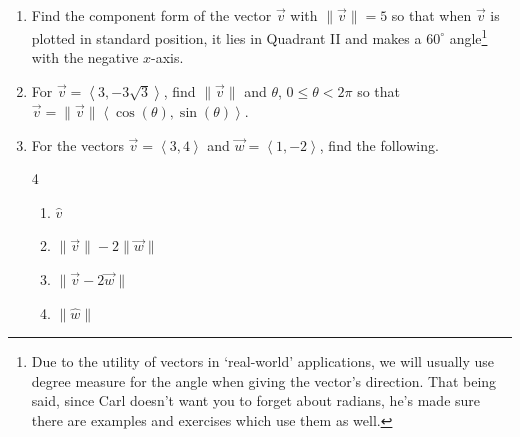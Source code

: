 \documentclass{ximera}
\begin{document}
\newpage

\begin{example} \label{polarformvecex} $~$

\begin{enumerate}

\item \label{resolvecomponents} Find the component form of the vector $\overrightarrow{v}$ with $\|\overrightarrow{v}\| = 5$ so that when $\overrightarrow{v}$ is plotted in standard position, it lies in Quadrant II and makes a $60^{\circ}$ angle\footnote{Due to the utility of vectors in `real-world' applications, we will usually use degree measure for the angle when giving the vector's direction.  That being said, since Carl doesn't want you to forget about radians, he's made sure there are examples and exercises which use them as well.} with the negative $x$-axis.

\item  For $\overrightarrow{v} = \left<3, -3\sqrt{3}\right>$, find $\|\overrightarrow{v}\|$ and $\theta$, $0 \leq \theta < 2\pi$ so that $\overrightarrow{v} = \| \overrightarrow{v} \| \left<\cos(\theta), \sin(\theta)\right>$.

\item For the vectors $\overrightarrow{v} = \left<3,4\right>$ and $\overrightarrow{w} = \left<1, -2\right>$, find the following.

\begin{multicols}{4}

\begin{enumerate}

\item  $\hat{v}$

\item  $\| \overrightarrow{v} \| -2 \|\overrightarrow{w}\|$

\item  $\| \overrightarrow{v} -2\overrightarrow{w}\|$

\item  $\| \hat{w} \|$ \label{preludetounitvector}

\end{enumerate}

\end{multicols}

\end{enumerate}

\begin{explanation}

\begin{enumerate}


\end{enumerate}
\end{explanation}
\end{example}
\end{document}
